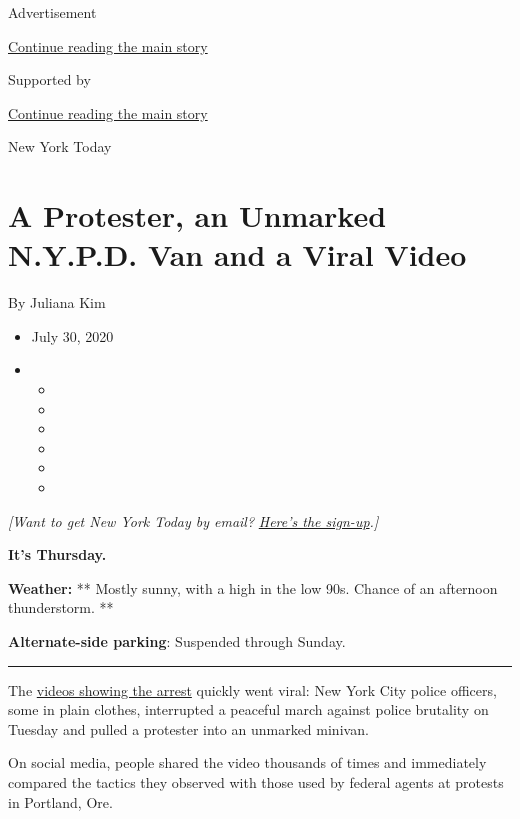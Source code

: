 Advertisement

\protect\hyperlink{after-top}{Continue reading the main story}

Supported by

\protect\hyperlink{after-sponsor}{Continue reading the main story}

New York Today

\hypertarget{a-protester-an-unmarked-nypd-van-and-a-viral-video}{%
\section{A Protester, an Unmarked N.Y.P.D. Van and a Viral
Video}\label{a-protester-an-unmarked-nypd-van-and-a-viral-video}}

By Juliana Kim

\begin{itemize}
\item
  July 30, 2020
\item
  \begin{itemize}
  \item
  \item
  \item
  \item
  \item
  \item
  \end{itemize}
\end{itemize}

\emph{{[}Want to get New York Today by email?}
\href{https://www.nytimes.com/newsletters/newyorktoday}{\emph{Here's the
sign-up}}\emph{.{]}}

\textbf{It's Thursday.}

\textbf{Weather:} ** Mostly sunny, with a high in the low 90s. Chance of
an afternoon thunderstorm. **

\textbf{Alternate-side parking}: Suspended through Sunday.

\begin{center}\rule{0.5\linewidth}{\linethickness}\end{center}

The
\href{https://twitter.com/Naddleez/status/1288232816451432453}{videos
showing the arrest} quickly went viral: New York City police officers,
some in plain clothes, interrupted a peaceful march against police
brutality on Tuesday and pulled a protester into an unmarked minivan.

On social media, people shared the video thousands of times and
immediately compared the tactics they observed with those used by
federal agents at protests in Portland, Ore.

